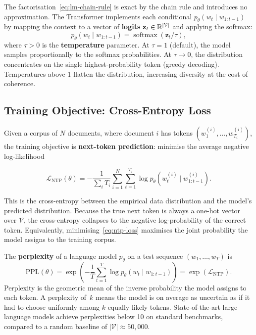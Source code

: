 The factorisation~\eqref{eq:lm-chain-rule} is exact by the chain rule and introduces no approximation. The Transformer implements each conditional $p_\theta(w_t \mid w_{1:t-1})$ by mapping the context to a vector of \textbf{logits} $\mathbf{z}_t \in \mathbb{R}^{|\mathcal{V}|}$ and applying the softmax:
\begin{equation}
\label{eq:lm-softmax}
p_\theta(w_t \mid w_{1:t-1}) = \operatorname{softmax}\!\left(\mathbf{z}_t / \tau\right),
\end{equation}
where $\tau > 0$ is the \textbf{temperature} parameter. At $\tau = 1$ (default), the model samples proportionally to the softmax probabilities. At $\tau \to 0$, the distribution concentrates on the single highest-probability token (greedy decoding). Temperatures above 1 flatten the distribution, increasing diversity at the cost of coherence.

\subsection{Training Objective: Cross-Entropy Loss}

Given a corpus of $N$ documents, where document $i$ has tokens $(w_1^{(i)}, \ldots, w_{T_i}^{(i)})$, the training objective is \textbf{next-token prediction}: minimise the average negative log-likelihood

\begin{equation}
\label{eq:ntp-loss}
\mathcal{L}_{\mathrm{NTP}}(\theta) = -\frac{1}{\sum_i T_i}\sum_{i=1}^{N}\sum_{t=1}^{T_i} \log p_\theta\!\left(w_t^{(i)} \mid w_{1:t-1}^{(i)}\right).
\end{equation}

This is the cross-entropy between the empirical data distribution and the model's predicted distribution. Because the true next token is always a one-hot vector over $\mathcal{V}$, the cross-entropy collapses to the negative log-probability of the correct token. Equivalently, minimising~\eqref{eq:ntp-loss} maximises the joint probability the model assigns to the training corpus.

\begin{definition}[Perplexity]
\label{def:perplexity}
The \textbf{perplexity} of a language model $p_\theta$ on a test sequence $(w_1, \ldots, w_T)$ is
\begin{equation}
\label{eq:perplexity}
\mathrm{PPL}(\theta) = \exp\!\left(-\frac{1}{T}\sum_{t=1}^{T}\log p_\theta(w_t \mid w_{1:t-1})\right) = \exp(\mathcal{L}_{\mathrm{NTP}}).
\end{equation}
Perplexity is the geometric mean of the inverse probability the model assigns to each token. A perplexity of~$k$ means the model is on average as uncertain as if it had to choose uniformly among $k$ equally likely tokens. State-of-the-art large language models achieve perplexities below 10 on standard benchmarks, compared to a random baseline of $|\mathcal{V}| \approx 50{,}000$.
\end{definition}

